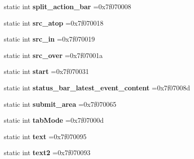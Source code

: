 \begin{DoxyCompactItemize}
static int {\bfseries split\+\_\+action\+\_\+bar} =0x7f070008
\item 
\mbox{\label{classandroid_1_1support_1_1v4_1_1R_1_1id_aa53eef2ad8baf7759987363d08a245fe}} 
static int {\bfseries src\+\_\+atop} =0x7f070018
\item 
\mbox{\label{classandroid_1_1support_1_1v4_1_1R_1_1id_ab0f8bf6959e2ac94c83da544f3d24891}} 
static int {\bfseries src\+\_\+in} =0x7f070019
\item 
\mbox{\label{classandroid_1_1support_1_1v4_1_1R_1_1id_ab1997b7f6030f80b937baf4997dfbd36}} 
static int {\bfseries src\+\_\+over} =0x7f07001a
\item 
\mbox{\label{classandroid_1_1support_1_1v4_1_1R_1_1id_a17afe15b601e163d89f0f4e482c5bf26}} 
static int {\bfseries start} =0x7f070031
\item 
\mbox{\label{classandroid_1_1support_1_1v4_1_1R_1_1id_a0451136cb64f989a8be763c051f16d58}} 
static int {\bfseries status\+\_\+bar\+\_\+latest\+\_\+event\+\_\+content} =0x7f07008d
\item 
\mbox{\label{classandroid_1_1support_1_1v4_1_1R_1_1id_a09b87071c60388a7f8e124d0eb306551}} 
static int {\bfseries submit\+\_\+area} =0x7f070065
\item 
\mbox{\label{classandroid_1_1support_1_1v4_1_1R_1_1id_af05b591811f801e76cc6be34181178f4}} 
static int {\bfseries tab\+Mode} =0x7f07000d
\item 
\mbox{\label{classandroid_1_1support_1_1v4_1_1R_1_1id_aa4a2b9ecef48527cc982ebd6c6ac5168}} 
static int {\bfseries text} =0x7f070095
\item 
\mbox{\label{classandroid_1_1support_1_1v4_1_1R_1_1id_a412e4e9927857d4d4094e7c27eca2f0d}} 
static int {\bfseries text2} =0x7f070093
\item 
\mbox{\label{classandroid_1_1support_1_1v4_1_1R_1_1id_aaa574a9ee058aeb9a86676d66d8b73c2}} 

\end{DoxyCompactItemize}
